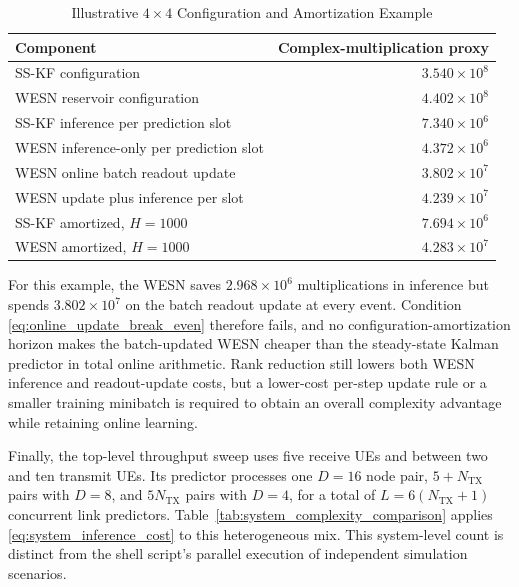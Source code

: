 \documentclass[lettersize,journal]{IEEEtran}
\begin{document}
\begin{table}[t]
\centering
\caption{Illustrative $4\times4$ Configuration and Amortization Example}
\label{tab:amortized_complexity_example}
\begin{tabular}{l r}
\toprule
Component & Complex-multiplication proxy\\
\midrule
SS-KF configuration & $3.540\times10^{8}$\\
WESN reservoir configuration & $4.402\times10^{8}$\\
SS-KF inference per prediction slot & $7.340\times10^{6}$\\
WESN inference-only per prediction slot & $4.372\times10^{6}$\\
WESN online batch readout update & $3.802\times10^{7}$\\
WESN update plus inference per slot & $4.239\times10^{7}$\\
SS-KF amortized, $H=1000$ & $7.694\times10^{6}$\\
WESN amortized, $H=1000$ & $4.283\times10^{7}$\\
\bottomrule
\end{tabular}
\end{table}

For this example, the WESN saves $2.968\times10^6$ multiplications in
inference but spends $3.802\times10^7$ on the batch readout update at every
event.  Condition \eqref{eq:online_update_break_even} therefore fails, and no
configuration-amortization horizon makes the batch-updated WESN cheaper than
the steady-state Kalman predictor in total online arithmetic.  Rank reduction
still lowers both WESN inference and readout-update costs, but a lower-cost
per-step update rule or a smaller training minibatch is required to obtain an
overall complexity advantage while retaining online learning.

Finally, the top-level throughput sweep uses five receive UEs and between two
and ten transmit UEs.  Its predictor processes one $D=16$ node pair,
$5+N_{\mathrm{TX}}$ pairs with $D=8$, and $5N_{\mathrm{TX}}$ pairs with
$D=4$, for a total of $L=6(N_{\mathrm{TX}}+1)$ concurrent link predictors.
Table~\ref{tab:system_complexity_comparison} applies
\eqref{eq:system_inference_cost} to this heterogeneous mix.  This system-level
count is distinct from the shell script's parallel execution of independent
simulation scenarios.
\end{document}
